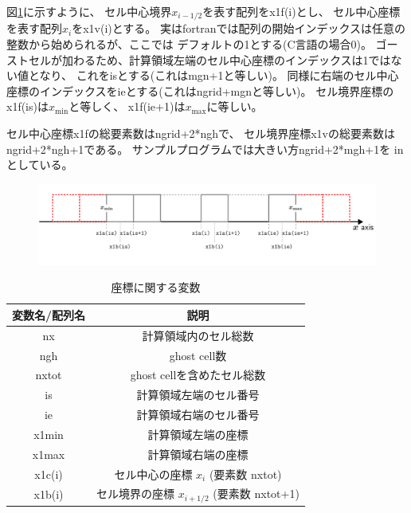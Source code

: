 図\ref{fig:hydro_mesh}に示すように、
セル中心境界$x_{i-1/2}$を表す配列を{\ttfamily x1f(i)}とし、
セル中心座標を表す配列$x_i$を{\ttfamily x1v(i)}とする。
実はfortranでは配列の開始インデックスは任意の整数から始められるが、ここでは
デフォルトの1とする(C言語の場合0)。
ゴーストセルが加わるため、計算領域左端のセル中心座標のインデックスは1ではない値となり、
これを{\ttfamily is}とする(これは{\ttfamily mgn+1}と等しい)。
同様に右端のセル中心座標のインデックスを{\ttfamily ie}とする(これは{\ttfamily ngrid+mgn}と等しい)。
セル境界座標の{\ttfamily x1f(is)}は$x_\mathrm{min}$と等しく、
{\ttfamily x1f(ie+1)}は$x_\mathrm{max}$に等しい。

セル中心座標{\ttfamily x1f}の総要素数は{\ttfamily ngrid+2*ngh}で、
セル境界座標{\ttfamily x1v}の総要素数は{\ttfamily ngrid+2*ngh+1}である。
サンプルプログラムでは大きい方{\ttfamily ngrid+2*mgh+1}を
{\ttfamily in}としている。

\begin{figure}[htpb]
    \centering
    \includegraphics[width=17cm]{figures/hydro_mesh.pdf}
    \caption{
    }
    \label{fig:hydro_mesh}
\end{figure}

\begin{table}[h]
\begin{center}
\caption{座標に関する変数}
\begin{tabular}{|c|c|}
    \hline
    変数名/配列名 & 説明 \\
    \hline
    \hline
    {\ttfamily nx} & 計算領域内のセル総数 \\
    \hline
    {\ttfamily ngh} & ghost cell数 \\
    \hline
    {\ttfamily nxtot} & ghost cellを含めたセル総数 \\
    \hline
    {\ttfamily is} & 計算領域左端のセル番号\\
    \hline
    {\ttfamily ie} & 計算領域右端のセル番号\\
    \hline
    {\ttfamily x1min} & 計算領域左端の座標 \\
    \hline
    {\ttfamily x1max} & 計算領域右端の座標 \\
    \hline
    {\ttfamily x1c(i)} & セル中心の座標 $x_{i}$ (要素数 {\ttfamily nxtot}) \\
    \hline
    {\ttfamily x1b(i)} & セル境界の座標 $x_{i+1/2}$ (要素数 {\ttfamily nxtot+1}) \\
    \hline
\end{tabular}
\end{center}
\end{table}

